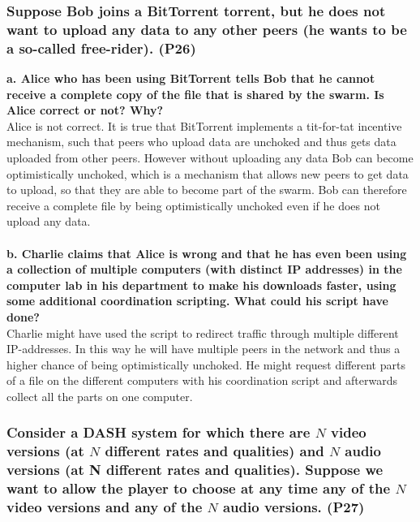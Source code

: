 \subsubsection{Suppose Bob joins a BitTorrent torrent, but he does not want to upload any data to any other peers (he wants to be a so-called free-rider). (P26)}

\textbf{a. Alice who has been using BitTorrent tells Bob that he cannot receive a complete copy of the file that is shared by the swarm. Is Alice correct or not? Why?} \\
Alice is not correct. It is true that BitTorrent implements a tit-for-tat incentive mechanism, such that peers who upload data are unchoked and thus gets data uploaded from other peers. However without uploading any data Bob can become optimistically unchoked, which is a mechanism that allows new peers to get data to upload, so that they are able to become part of the swarm. Bob can therefore receive a complete file by being optimistically unchoked even if he does not upload any data. \\
\\
\textbf{b. Charlie claims that Alice is wrong and that he has even been using a collection of multiple computers (with distinct IP addresses) in the computer lab in his department to make his downloads faster, using some additional coordination scripting. What could his script have done?} \\
Charlie might have used the script to redirect traffic through multiple different IP-addresses. In this way he will have multiple peers in the network and thus a higher chance of being optimistically unchoked. He might request different parts of a file on the different computers with his coordination script and afterwards collect all the parts on one computer. \\


\subsubsection{Consider a DASH system for which there are $N$ video versions (at $N$ different rates and qualities) and $N$ audio versions (at N different rates and qualities). Suppose we want to allow the player to choose at any time any of the $N$ video versions and any of the $N$ audio versions. (P27)}

